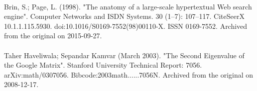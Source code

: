 \documentclass{article}
\begin{document}
\paragraph{}
Brin, S.; Page, L. (1998). "The anatomy of a large-scale hypertextual Web search engine". 
Computer Networks and ISDN Systems. 30 (1–7): 107–117. CiteSeerX 10.1.1.115.5930. doi:10.1016/S0169-7552(98)00110-X. ISSN 0169-7552. 
Archived from the original on 2015-09-27.
\paragraph{}
Taher Haveliwala; Sepandar Kamvar (March 2003). "The Second Eigenvalue of the Google Matrix". 
Stanford University Technical Report: 7056. arXiv:math/0307056. Bibcode:2003math......7056N. 
Archived from the original on 2008-12-17.
\end{document}
